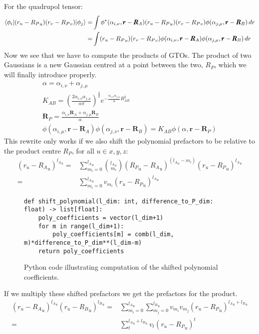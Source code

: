 For the quadrupol tensor:
\begin{align}
        \braket{\phi_i|(r_u-{R_P}_u)(r_v-{R_P}_v)|\phi_j} = &\int \phi^*(\alpha_{i,\nu},\pmb r-\pmb R_A)(r_u-{R_P}_u)(r_v-{R_P}_v)\phi(\alpha_{j,\mu},\pmb r-\pmb R_B)\,dr\\
        =&\int (r_u-{R_P}_u)(r_v-{R_P}_v)\phi(\alpha_{i,\nu},\pmb r-\pmb R_A)\phi(\alpha_{j,\mu},\pmb r-\pmb R_B)\,dr\notag
\end{align}
Now we see that we have to compute the products of GTOs. The product of two Gaussians is a new Gaussian centred at a point between the two, $R_P$, which we will finally introduce properly.
\begin{gather}
    \alpha = \alpha_{i,\nu}+\alpha_{j,\mu}\\
    K_{AB} = \left(\frac{2\alpha_{i,\nu}\alpha_{j,\mu}}{\alpha\pi}\right)^\frac{3}{4}e^{-\frac{\alpha_{i,\nu}\alpha_{j,\mu}}{\alpha}R_{AB}^2}\\
    \pmb R_P = \frac{\alpha_{i,\nu}\pmb R_A+\alpha_{j,\mu}\pmb R_B}{\alpha}\\
    \phi(\alpha_{i,\mu},\pmb r-\pmb R_A)\phi(\alpha_{j,\nu},\pmb r-\pmb R_B) = K_{AB}\phi(\alpha,\pmb r-\pmb R_P)
\end{gather}
This rewrite only works if we also shift the polynomial prefactors to be relative to the product centre $R_P$, for all $u\in x,y,z$:
\begin{equation}
\begin{split}
    (r_u-{R_A}_u)^{{l_A}_u} = &\sum_{m_i=0}^{{l_A}_u}\binom{{l_A}_u}{m_i}({R_P}_u-{R_A}_u)^{({l_A}_u-m_i)}(r_u-{R_P}_u)^{{l_A}_u}\\
    =&\sum_{m_i=0}^{{l_A}_u}v_{m_i}(r_u-{R_P}_u)^{{l_A}_u}
\end{split}
\end{equation}
\begin{figure}[H]
\begin{verbatim}
def shift_polynomial(l_dim: int, difference_to_P_dim: float) -> list[float]:
    poly_coefficients = vector(l_dim+1)
    for m in range(l_dim+1):
        poly_coefficients[m] = comb(l_dim, m)*difference_to_P_dim**(l_dim-m)
    return poly_coefficients
\end{verbatim}
    \caption{Python code illustrating computation of the shifted polynomial coefficients.}
\end{figure}
If we multiply these shifted prefactors we get the prefactors for the product. 
\begin{equation}
\begin{split}
    (r_u-{R_A}_u)^{{l_A}_u}(r_u-{R_B}_u)^{{l_B}_u} = &\sum_{m_i=0}^{{l_A}_u}\sum_{m_j=0}^{{l_B}_u}v_{m_i}v_{m_j}(r_u-{R_P}_u)^{{l_A}_u+{l_B}_u}\\
    =&\sum_t^{{l_A}_u+{l_B}_u}v_t(r_u-{R_P}_u)^t
\end{split}
\end{equation}

